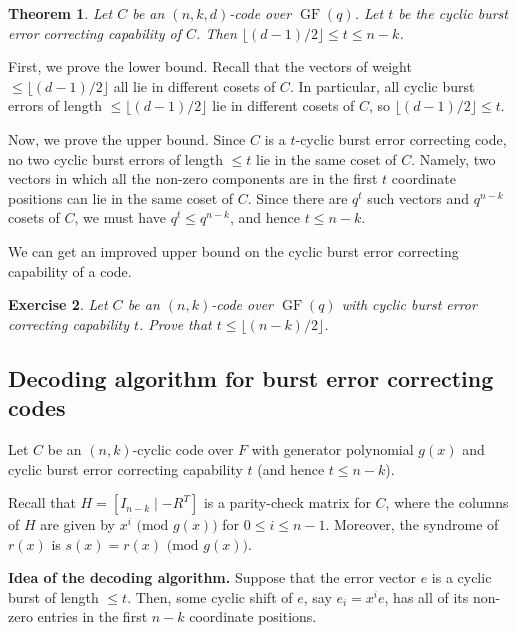 \documentclass[10pt]{article}
\makeatletter
\DeclareMathOperator{\GF}{GF}
\theoremstyle{newstyle}
\newtheorem{thm}{Theorem}[subsection]
\newtheorem{exercise}[thm]{Exercise}
\newenvironment{pf}[1][\proofname]{\par
  \pushQED{\qed}%
  \normalfont \topsep0\p@\relax
  \trivlist
  \item[\hskip\labelsep\scshape
  #1\@addpunct{.}]\ignorespaces
}{%
  \popQED\endtrivlist\@endpefalse
}
\makeatother
\begin{document}
\begin{thm}
Let $C$ be an $(n, k, d)$-code over $\GF(q)$. Let $t$ be the cyclic burst error 
correcting capability of $C$. Then 
$\lfloor (d-1)/2 \rfloor \leq t \leq n-k$.
\end{thm}
\begin{pf}
First, we prove the lower bound. Recall that the vectors of weight $\leq \lfloor (d-1)/2
\rfloor$ all lie in different cosets of $C$. In particular, all cyclic burst errors of 
length $\leq \lfloor (d-1)/2 \rfloor$ lie in different cosets of $C$, so 
$\lfloor (d-1)/2 \rfloor \leq t$. 

Now, we prove the upper bound. Since $C$ is a $t$-cyclic burst error correcting code, no two 
cyclic burst errors of length $\leq t$ lie in the same coset of $C$. Namely, two vectors in 
which all the non-zero components are in the first $t$ coordinate positions can lie in the 
same coset of $C$. Since there are $q^t$ such vectors and $q^{n-k}$ cosets of $C$, 
we must have $q^t \leq q^{n-k}$, and hence $t \leq n-k$. 
\end{pf}

We can get an improved upper bound on the cyclic burst error correcting capability of a code. 

\begin{exercise}
Let $C$ be an $(n, k)$-code over $\GF(q)$ with cyclic burst error correcting capability $t$. 
Prove that $t \leq \lfloor (n-k)/2 \rfloor$. 
\end{exercise}

\subsection{Decoding algorithm for burst error correcting codes}

Let $C$ be an $(n, k)$-cyclic code over $F$ with generator polynomial $g(x)$ and cyclic burst 
error correcting capability $t$ (and hence $t \leq n-k$). 

Recall that $H = [I_{n-k} \mid -R^T]$ is a parity-check matrix for $C$, where the columns of 
$H$ are given by $x^i \text{ (mod $g(x)$)}$ for $0 \leq i \leq n-1$. Moreover, the syndrome of 
$r(x)$ is $s(x) = r(x) \text{ (mod $g(x)$)}$. 

{\bf Idea of the decoding algorithm.} Suppose that the error vector $e$ is a cyclic burst 
of length $\leq t$. Then, some cyclic shift of $e$, say $e_i = x^i e$, has all of its non-zero 
entries in the first $n-k$ coordinate positions. 
\end{document}
